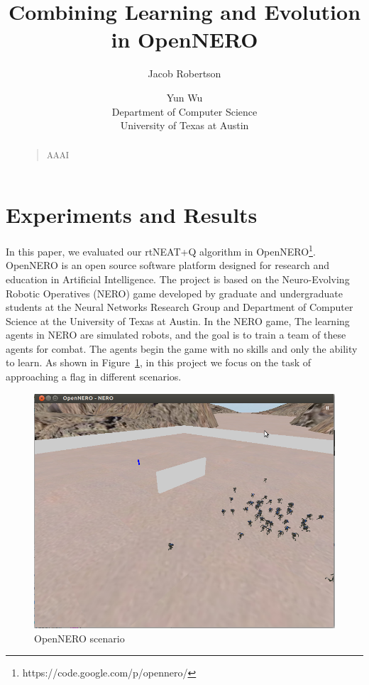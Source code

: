\documentclass[letterpaper]{article}
\begin{document}
%
\title{Combining Learning and Evolution in OpenNERO}
\author{Jacob Robertson \and Yun Wu\\
Department of Computer Science\\
University of Texas at Austin\\
}
\maketitle
\begin{abstract}
\begin{quote}
AAAI
\end{quote}
\end{abstract}

\section{Experiments and Results}
\label{sec:exp}
In this paper, we evaluated our rtNEAT+Q algorithm in OpenNERO\footnote{https://code.google.com/p/opennero/}. OpenNERO is an open source software platform designed for research and education in Artificial Intelligence. The project is based on the Neuro-Evolving Robotic Operatives (NERO) game developed by graduate and undergraduate students at the Neural Networks Research Group and Department of Computer Science at the University of Texas at Austin. In the NERO game, The learning agents in NERO are simulated robots, and the goal is to train a team of these agents for combat. The agents begin the game with no skills and only the ability to learn. As shown in Figure~\ref{fig:opennero}, in this project we focus on the task of approaching a flag in different scenarios.
\begin{figure}[ht]
\centering
  \includegraphics[width=0.7\columnwidth]{opennero.png}
\caption{OpenNERO scenario}
\label{fig:opennero}
\end{figure}
\end{document}
